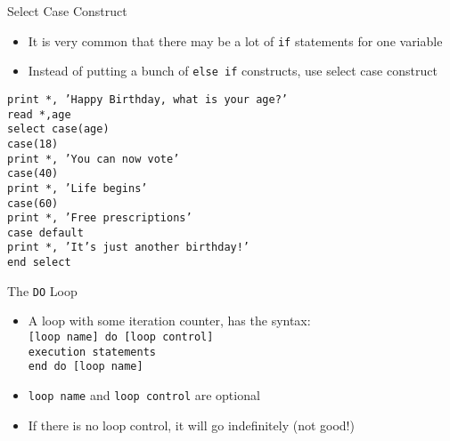 \documentclass{beamer}
\begin{document}
\begin{frame}{Select Case Construct}

  \begin{itemize}
    \item It is very common that there may be a lot of \texttt{if} statements for one variable
    \vfill\item Instead of putting a bunch of \texttt{else if} constructs, use \alert{select case} construct
  \end{itemize}
  \vfill
  \scriptsize{
  \texttt{print *, 'Happy Birthday, what is your age?'} \\
  \texttt{read *,age} \\
  \texttt{select case(age)} \\
  \texttt{case(18)} \\
    \hspace{0.1cm} \texttt{print *, 'You can now vote'} \\
  \texttt{case(40)} \\
    \hspace{0.1cm} \texttt{print *, 'Life begins'} \\
  \texttt{case(60)} \\
    \hspace{0.1cm} \texttt{print *, 'Free prescriptions'} \\
  \texttt{case default} \\
    \hspace{0.1cm} \texttt{print *, 'It's just another birthday!'} \\
  \texttt{end select}
  }
\end{frame}
\begin{frame}{The \texttt{DO} Loop}

  \begin{itemize}
    \item A loop with some iteration counter, has the syntax: \\
      \vfill
      \hspace{1.9cm} \texttt{[loop name] do [loop control]} \\
      \hspace{2.5cm} \texttt{execution statements} \\
      \hspace{2cm} \texttt{end do [loop name]}
    \vfill\item \texttt{loop name} and \texttt{loop control} are optional
    \vfill\item If there is no loop control, it will go indefinitely (not good!)
  \end{itemize}

\end{frame}
\end{document}
